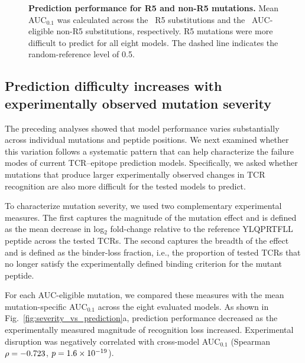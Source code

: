 \documentclass{article}
\begin{document}

\begin{figure}[!htbp]
\centering

%

\caption{
\textbf{Prediction performance for R5 and non-R5 mutations.}
Mean AUC$_{0.1}$ was calculated across the \valNrfive\ R5 substitutions
and the \valNnonrfive\ AUC-eligible non-R5 substitutions, respectively.
R5 mutations were more difficult to predict for all eight models.
The dashed line indicates the random-reference level of 0.5.
}
\label{fig:r5_model_performance}

\end{figure}


\subsection{Prediction difficulty increases with experimentally observed mutation severity}

The preceding analyses showed that model performance varies substantially
across individual mutations and peptide positions. We next examined whether
this variation follows a systematic pattern that can help characterize the
failure modes of current TCR--epitope prediction models. Specifically, we
asked whether mutations that produce larger experimentally observed changes
in TCR recognition are also more difficult for the tested models to predict.

To characterize mutation severity, we used two complementary experimental
measures. The first captures the magnitude of the mutation effect and is
defined as the mean decrease in log$_2$ fold-change relative to the reference
YLQPRTFLL peptide across the tested TCRs. The second captures the breadth of
the effect and is defined as the binder-loss fraction, i.e., the proportion
of tested TCRs that no longer satisfy the experimentally defined binding
criterion for the mutant peptide.

For each AUC-eligible mutation, we compared these measures with the mean
mutation-specific AUC$_{0.1}$ across the eight evaluated models. As shown in
Fig.~\ref{fig:severity_vs_prediction}a, prediction performance decreased as
the experimentally measured magnitude of recognition loss increased.
Experimental disruption was negatively correlated with cross-model
AUC$_{0.1}$ (Spearman $\rho=-0.723$, $p=1.6\times10^{-19}$).
\end{document}
